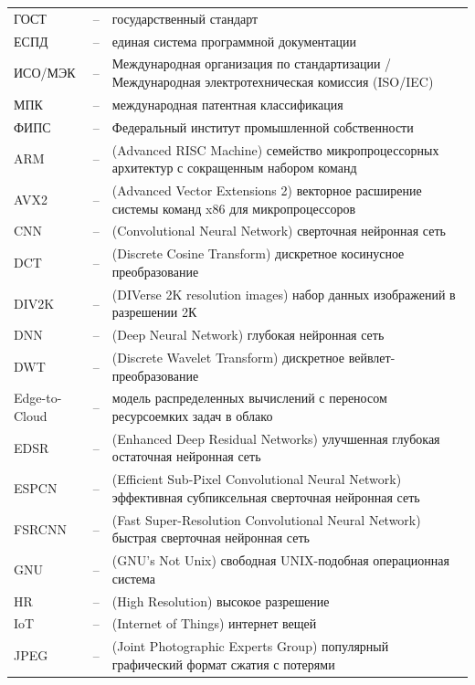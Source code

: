 
{\sloppy
\begin{longtable}{@{} p{} @{} c @{\hspace{0.4em}} p{} @{}}
ГОСТ & -- & государственный стандарт \\
ЕСПД & -- & единая система программной документации \\
ИСО/МЭК & -- & Международная организация по стандартизации / Международная электротехническая комиссия (ISO/IEC) \\
МПК & -- & международная патентная классификация \\
ФИПС & -- & Федеральный институт промышленной собственности \\
ARM & -- & (Advanced RISC Machine) семейство микропроцессорных архитектур с сокращенным набором команд \\
AVX2 & -- & (Advanced Vector Extensions 2) векторное расширение системы команд x86 для микропроцессоров \\
CNN & -- & (Convolutional Neural Network) сверточная нейронная сеть \\
DCT & -- & (Discrete Cosine Transform) дискретное косинусное преобразование \\
DIV2K & -- & (DIVerse 2K resolution images) набор данных изображений в разрешении 2К \\
DNN & -- & (Deep Neural Network) глубокая нейронная сеть \\
DWT & -- & (Discrete Wavelet Transform) дискретное вейвлет-преобразование \\
Edge-to-Cloud & -- & модель распределенных вычислений с переносом ресурсоемких задач в облако \\
EDSR & -- & (Enhanced Deep Residual Networks) улучшенная глубокая остаточная нейронная сеть \\
ESPCN & -- & (Efficient Sub-Pixel Convolutional Neural Network) эффективная субпиксельная сверточная нейронная сеть \\
FSRCNN & -- & (Fast Super-Resolution Convolutional Neural Network) быстрая сверточная нейронная сеть \\
GNU & -- & (GNU's Not Unix) свободная UNIX-подобная операционная система \\
HR & -- & (High Resolution) высокое разрешение \\
IoT & -- & (Internet of Things) интернет вещей \\
JPEG & -- & (Joint Photographic Experts Group) популярный графический формат сжатия с потерями \\

\end{longtable}}
